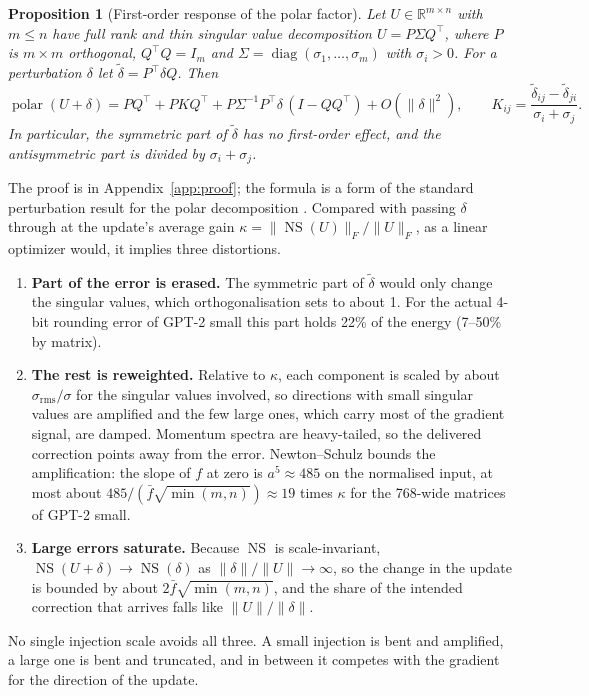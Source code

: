 \documentclass[11pt]{article}
\newtheorem{proposition}{Proposition}
\newcommand{\NS}{\operatorname{NS}}
\newcommand{\polar}{\operatorname{polar}}
\newcommand{\norm}[1]{\lVert #1 \rVert}
\begin{document}
\begin{proposition}[First-order response of the polar factor]\label{prop:polar}
Let $U\in\mathbb{R}^{m\times n}$ with $m\le n$ have full rank and thin singular value decomposition
$U=P\Sigma Q^\top$, where $P$ is $m\times m$ orthogonal, $Q^\top Q = I_m$ and
$\Sigma=\operatorname{diag}(\sigma_1,\dots,\sigma_m)$ with $\sigma_i>0$. For a perturbation $\delta$ let
$\tilde\delta = P^\top\delta Q$. Then
\begin{equation}\label{eq:polar}
  \polar(U+\delta) = PQ^\top + P K Q^\top + P\Sigma^{-1}P^\top\delta\,(I - QQ^\top) + O(\norm{\delta}^2), \qquad
  K_{ij} = \frac{\tilde\delta_{ij} - \tilde\delta_{ji}}{\sigma_i + \sigma_j} .
\end{equation}
In particular, the symmetric part of $\tilde\delta$ has no first-order effect, and the antisymmetric part is divided
by $\sigma_i+\sigma_j$.
\end{proposition}

The proof is in Appendix~\ref{app:proof}; the formula is a form of the standard perturbation result for the polar
decomposition \citep[Ch.~8]{higham2008functions}. Compared with passing $\delta$ through at the update's average gain
$\kappa = \norm{\NS(U)}_F/\norm{U}_F$, as a linear optimizer would, it implies three distortions.
\begin{enumerate}
  \item \textbf{Part of the error is erased.} The symmetric part of $\tilde\delta$ would only change the singular
        values, which orthogonalisation sets to about 1. For the actual 4-bit rounding error of GPT-2 small this part
        holds 22\% of the energy (7--50\% by matrix).
  \item \textbf{The rest is reweighted.} Relative to $\kappa$, each component is scaled by about
        $\sigma_{\text{rms}}/\sigma$ for the singular values involved, so directions with small singular values are
        amplified and the few large ones, which carry most of the gradient signal, are damped. Momentum spectra are
        heavy-tailed, so the delivered correction points away from the error. Newton--Schulz bounds the amplification:
        the slope of $f$ at zero is $a^5 \approx 485$ on the normalised input, at most about
        $485/(\bar f\sqrt{\min(m,n)}) \approx 19$ times $\kappa$ for the 768-wide matrices of GPT-2 small.
  \item \textbf{Large errors saturate.} Because $\NS$ is scale-invariant, $\NS(U+\delta) \to \NS(\delta)$ as
        $\norm{\delta}/\norm{U} \to \infty$, so the change in the update is bounded by about
        $2\bar f\sqrt{\min(m,n)}$, and the share of the intended correction that arrives falls like
        $\norm{U}/\norm{\delta}$.
\end{enumerate}
No single injection scale avoids all three. A small injection is bent and amplified, a large one is bent and
truncated, and in between it competes with the gradient for the direction of the update.
\end{document}
